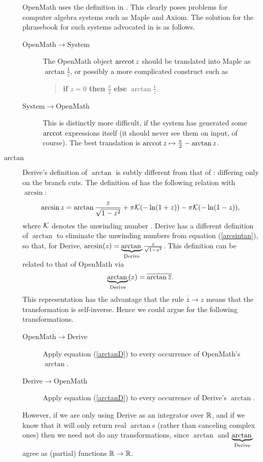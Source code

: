 \documentclass[keylogo]{openmath}
\begin{document}
\begin{description}
\begin{table}[t]
\mbox{}
\end{table} OpenMath uses the definition in
\cite[ninth printing]{AS}. This clearly poses problems for computer algebra
systems such as Maple and Axiom. The solution for the phrasebook for such
systems advocated in \cite{CDJW} is as follows.
\begin{description}
\item[OpenMath$\rightarrow$System]The OpenMath object $\mathop{\rm arccot} z$ should be
translated into Maple as $\arctan\frac1z$, or possibly a more complicated
construct such as 
\begin{quote}
{\bf if} $z=0$ {\bf then} $\frac\pi2$ {\bf else} $\arctan\frac1z$. 
\end{quote}
\item[System$\rightarrow$OpenMath]This is distinctly more difficult, if the
system has generated some $\mathop{\rm arccot}$ expressions itself (it should never see
them on input, of course). The best translation is $\mathop{\rm arccot} z \mapsto
\frac\pi2-\arctan z$.
\end{description}
\item[$\arctan$]Derive's definition of $\arctan$ is subtly different from
that of \cite{AS}: differing only on the branch cuts. The definition of
\cite{AS} has the following relation with $\arcsin$:
\begin{equation}\label{arcsintan}
\arcsin z = \arctan\frac z{\sqrt{1-z^2}} +\pi\mathcal{K}(-\ln(1+z))-\pi\mathcal{K}(-\ln(1-z)),
\end{equation}
where $\mathcal{K}$ denotes the unwinding number \cite{CDJW}.
Derive has a different definition of $\arctan$ to eliminate the unwinding
numbers from equation (\ref{arcsintan}), so that, for Derive,
$\arcsin(z)=\underbrace{\mathop{\rm arctan}\nolimits{}}_{\mathop{\rm Derive}\nolimits}\frac
z{\sqrt{1-z^2}}$. This definition can be related to that of OpenMath via
\begin{equation}\label{arctanD}
\underbrace{\mathop{\rm arctan}\nolimits{}}_{\mathop{\rm Derive}\nolimits}(z)=\overline{\arctan\overline{z}}.
\end{equation}
This representation has the advantage that the rule
$\overline{\overline{z}}\rightarrow z$ means that the transformation is
self-inverse. Hence we could argue for the following transformations.
\begin{description}
\item[OpenMath$\rightarrow$Derive]Apply equation (\ref{arctanD}) to every
occurrence of OpenMath's $\arctan$.
\item[Derive$\rightarrow$OpenMath]Apply equation (\ref{arctanD}) to every
occurrence of Derive's $\arctan$.
\end{description}
However, if we are only using Derive as an integrator over $\mathbb{R}$, and if we
know that it will only return real $\arctan$s (rather than canceling
complex ones) then we need not do any transformations, since $\arctan$ and
$\underbrace{\mathop{\rm arctan}\nolimits{}}_{\mathop{\rm Derive}\nolimits}$ agree as (partial) functions $\mathbb{R}\rightarrow\mathbb{R}$.
\end{description}
\end{document}
